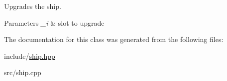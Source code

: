 Upgrades the ship. 


\begin{DoxyParams}{Parameters}
{\em \-\_\-i} & slot to upgrade \\
\hline
\end{DoxyParams}


The documentation for this class was generated from the following files\-:\begin{DoxyCompactItemize}
\item 
include/\hyperlink{ship_8hpp}{ship.\-hpp}\item 
src/ship.\-cpp\end{DoxyCompactItemize}
